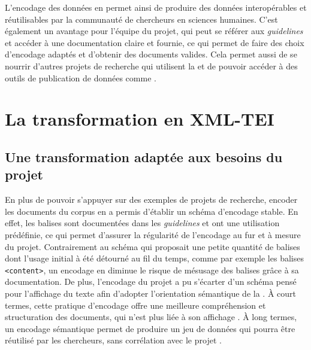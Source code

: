 L'encodage des données en \TEI permet ainsi de produire des données interopérables et réutilisables par la communauté de chercheurs en sciences humaines. C'est également un avantage pour l'équipe du projet, qui peut se référer aux \textit{guidelines} et accéder à une documentation claire et fournie, ce qui permet de faire des choix d'encodage adaptés et d'obtenir des documents \TEI valides. Cela permet aussi de se nourrir d'autres projets de recherche qui utilisent la \TEI et de pouvoir accéder à des outils de publication de données comme \tp. 

 \section{La transformation en XML-TEI}
    \subsection{Une transformation adaptée aux besoins du projet}
    
En plus de pouvoir s'appuyer sur des exemples de projets de recherche, encoder les documents du corpus en \TEI a permis d'établir un schéma d'encodage stable. En effet, les balises \TEI sont documentées dans les \textit{guidelines} et ont une utilisation prédéfinie, ce qui permet d'assurer la régularité de l'encodage au fur et à mesure du projet. Contrairement au schéma \LSC qui proposait une petite quantité de balises dont l'usage initial à été détourné au fil du temps, comme par exemple les balises \texttt{<content>}, un encodage en \TEI diminue le risque de mésusage des balises grâce à sa documentation. De plus, l'encodage du projet a pu s'écarter d'un schéma pensé pour l'affichage du texte afin d'adopter l'orientation sémantique de la \TEI. À court termes, cette pratique d'encodage offre une meilleure compréhension et structuration des documents, qui n'est plus liée à son affichage \HTML. À long termes, un encodage sémantique permet de produire un jeu de données qui pourra être réutilisé par les chercheurs, sans corrélation avec le projet \COREL. 

